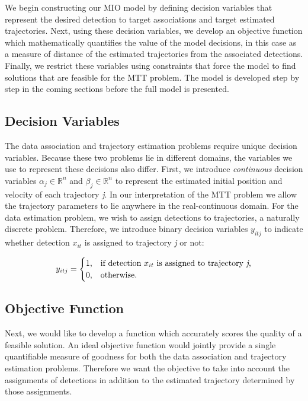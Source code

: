 \documentclass[journal]{IEEEtran}
\begin{document}
We begin constructing our MIO model by defining decision variables that represent the desired detection to target associations and target estimated trajectories. Next, using these decision variables, we develop an objective function which mathematically quantifies the value of the model decisions, in this case as a measure of distance of the estimated trajectories from the associated detections. Finally, we restrict these variables using constraints that force the model to find solutions that are feasible for the MTT problem. The model is developed step by step in the coming sections before the full model is presented. 

\subsection{Decision Variables}
The data association and trajectory estimation problems require unique decision variables. Because these two problems lie in different domains, the variables we use to represent these decisions also differ. First, we introduce \textit{continuous} decision variables $\alpha_{j} \in \mathbb{R}^n$ and $\beta_{j} \in \mathbb{R}^n$ to represent the estimated initial position and velocity of each trajectory \textit{j}.  In our interpretation of the MTT problem we allow the trajectory parameters to lie anywhere in the real-continuous domain. For the data estimation problem, we wish to assign detections to trajectories, a naturally discrete problem. Therefore, we introduce binary decision variables $y_{itj}$ to indicate whether detection $x_{it}$ is assigned to trajectory \textit{j} or not:

\begin{align}
y_{itj} =
\begin{cases}
1, & \text{if detection $x_{it}$ is assigned to trajectory \textit{j},} \\
0, & \text{otherwise.}
\end{cases}
\end{align}

\subsection{Objective Function}
Next, we would like to develop a function which accurately scores the quality of a feasible solution. An ideal objective function would jointly provide a single quantifiable measure of goodness for both the data association and trajectory estimation problems. Therefore we want the objective to take into account the assignments of detections in addition to the estimated trajectory determined by those assignments.
\end{document}
